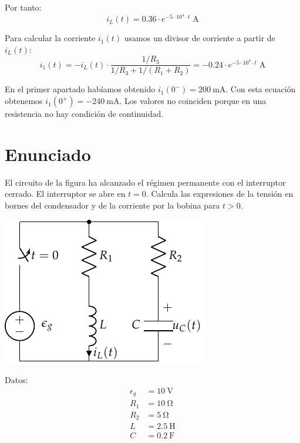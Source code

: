 Por tanto:
\begin{equation*}
  i_L(t) = 0.36 \cdot e^{-5 \cdot 10^{4} \cdot t}\;\si{\ampere}
\end{equation*}

\vspace{2mm}
Para calcular la corriente $i_1(t)$ usamos un divisor de corriente a
partir de $i_L(t)$:
\begin{equation*}
  i_1(t) = -i_L(t) \cdot \frac{1/R_3}{1/R_3 + 1/(R_1 + R_2)} = -0.24 \cdot e^{-5 \cdot 10^{4} \cdot t}\;\si{\ampere}
\end{equation*}

\vspace{3mm}
En el primer apartado habíamos obtenido
$i_1(0^-) = \SI{200}{\milli\ampere}$. Con esta ecuación obtenemos
$i_1(0^+) = -\SI{240}{\milli\ampere}$. Los valores no coinciden porque
en una resistencia no hay condición de continuidad.

\section{Enunciado}

El circuito de la figura ha alcanzado el régimen permanente con el
interruptor cerrado. El interruptor se abre en $t = 0$. Calcula las
expresiones de la tensión en bornes del condensador y de la corriente
por la bobina para $t > 0$.

\vspace{4mm}

\begin{minipage}{0.6\textwidth}
  \includegraphics[scale=1]{figuras/FM_4_8}
\end{minipage}
\hfill
\begin{minipage}{0.4\textwidth}
  Datos:
  \begin{align*}
    \epsilon_g &= \SI{10}{\volt}\\
    R_1 &= \SI{10}{\ohm}\\
    R_2 &= \SI{5}{\ohm}\\
    L &= \SI{2.5}{\henry}\\
    C &= \SI{0.2}{\farad}      
  \end{align*}
\end{minipage}

